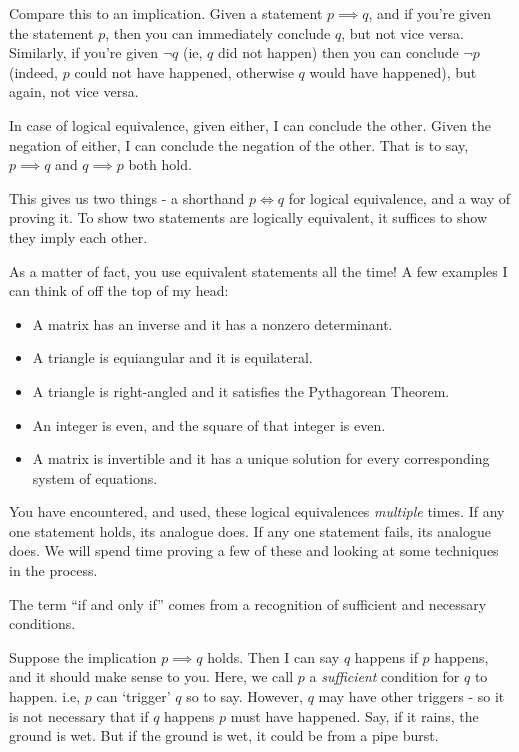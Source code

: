 Compare this to an implication. Given a statement $p \implies q$, and if you're given the statement $p$, then you can immediately conclude $q$, but not vice versa. Similarly, if you're given $\neg q$ (ie, $q$ did not happen) then you can conclude $\neg p$ (indeed, $p$ could not have happened, otherwise $q$ would have happened), but again, not vice versa.

In case of logical equivalence, given either, I can conclude the other. Given the negation of either, I can conclude the negation of the other. That is to say, $p \implies q$ and $q \implies p$ both hold.

This gives us two things - a shorthand $p \iff q$ for logical equivalence, and a way of proving it. To show two statements are logically equivalent, it suffices to show they imply each other.

As a matter of fact, you use equivalent statements all the time! A few examples I can think of off the top of my head:
\begin{itemize}
    \item A matrix has an inverse and it has a nonzero determinant.
    \item A triangle is equiangular and it is equilateral.
    \item A triangle is right-angled and it satisfies the Pythagorean Theorem.
    \item An integer is even, and the square of that integer is even.
    \item A matrix is invertible and it has a unique solution for every corresponding system of equations.
\end{itemize}

You have encountered, and used, these logical equivalences \textit{multiple} times. If any one statement holds, its analogue does. If any one statement fails, its analogue does. We will spend time proving a few of these and looking at some techniques in the process.

The term ``if and only if'' comes from a recognition of sufficient and necessary conditions.

Suppose the implication $p \implies q$ holds. Then I can say $q$ happens if $p$ happens, and it should make sense to you. Here, we call $p$ a \textit{sufficient} condition for $q$ to happen. i.e, $p$ can `trigger' $q$ so to say. However, $q$ may have other triggers - so it is not necessary that if $q$ happens $p$ must have happened. Say, if it rains, the ground is wet. But if the ground is wet, it could be from a pipe burst.

